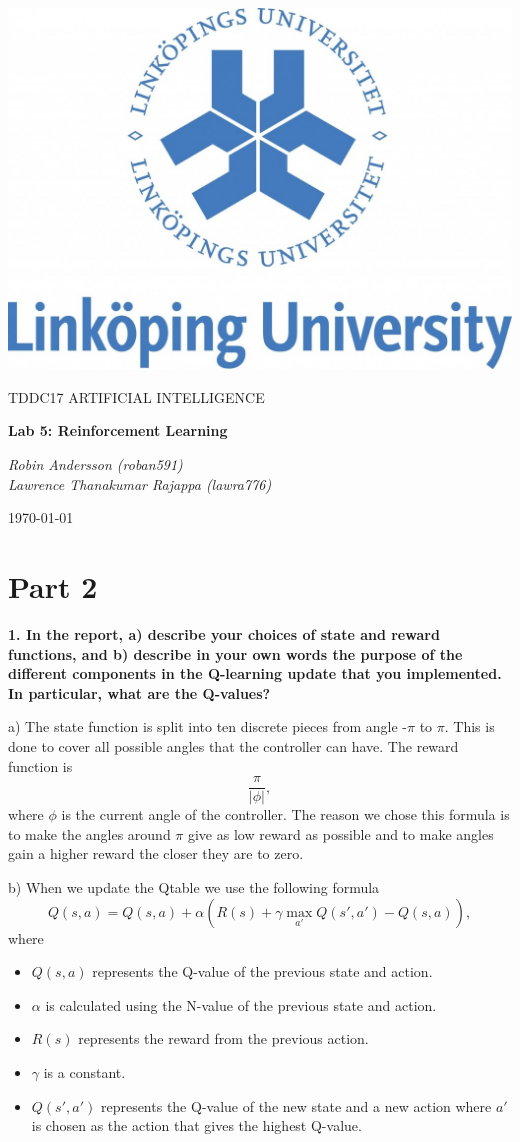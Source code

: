 \documentclass[a4paper,10pt]{article}
\begin{document}
\begin{titlepage}
	\centering
	\includegraphics[width=.6\textwidth]{liu-logo.png}\par
	\vfill
	{\scshape\Large TDDC17 ARTIFICIAL INTELLIGENCE\par}
	{\huge\bfseries Lab 5: Reinforcement Learning\par}
	\vspace{1cm}
	{\large\itshape Robin Andersson (roban591) \\ Lawrence Thanakumar Rajappa (lawra776)\par}
	\vfill
	{\large \today\par}
\end{titlepage}

\section{Part 2}

\textbf{1. In the report, 
a) describe your choices of state and reward functions, and
b) describe in your own words the purpose of the different components in the Q-learning 
update that you implemented. In particular, what are the Q-values?}

a)
The state function is split into ten discrete pieces from angle -$\pi$ to $\pi$. 
This is done to cover all possible angles that the controller can have.
The reward function is
\begin{equation*}
    \frac{\pi}{|\phi|},
\end{equation*} 
where $\phi$ is the current angle of the controller.
The reason we chose this formula is to make the angles around $\pi$ give as low reward as possible
and to make angles gain a higher reward the closer they are to zero.

b)
When we update the Qtable we use the following formula
\begin{equation*}
    Q(s, a) = Q(s, a) + \alpha(R(s) + \gamma \max_{a'}Q(s', a') - Q(s,a)),
\end{equation*}
where 
\begin{itemize}
    \item $Q(s, a)$ represents the Q-value of the previous state and action.
    \item $\alpha$ is calculated using the N-value of the previous state and action.
    \item $R(s)$ represents the reward from the previous action.
    \item $\gamma$ is a constant. 
    \item $Q(s', a')$ represents the Q-value of the new state and a new action where $a'$
    is chosen as the action that gives the highest Q-value.
\end{itemize} 
\end{document}
